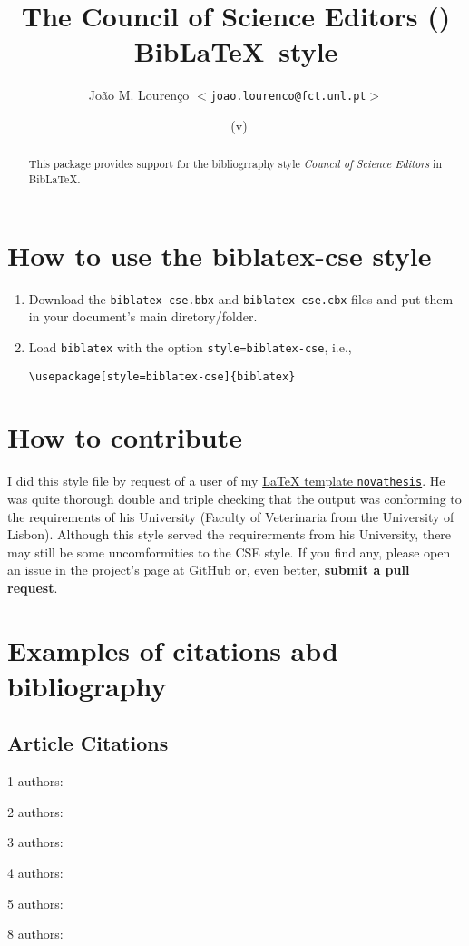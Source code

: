 \documentclass[
  a4paper, %
  11pt, %
]{article}
\title{The Council of Science Editors (\textsf{\filename}) Bib\LaTeX\ style}
\author{João M. Lourenço $<$\texttt{joao.lourenco@fct.unl.pt}$>$}
\date{\filedate\ (v\fileversion)}
\newcommand{\novathesis}{\texttt{novathesis}}
\newcommand{\nauthors}[1]{#1 authors: }
\begin{document}
  
  \maketitle

\begin{abstract}
    This package provides support for the bibliogrraphy style \emph{Council of Science Editors} in BibLaTeX.
\end{abstract}

\section{How to use the biblatex-cse style}

\begin{enumerate}
  \item Download the \texttt{biblatex-cse.bbx} and \texttt{biblatex-cse.cbx} files and put them in your document's main diretory/folder.
  \item Load \texttt{biblatex} with the option \texttt{style=biblatex-cse}, i.e.,
\begin{verbatim}
\usepackage[style=biblatex-cse]{biblatex}  
\end{verbatim}
\end{enumerate}

\section{How to contribute}

I did this style file by request of a user of my \href{https://github.com/joaomlourenco/novathesis}{LaTeX template \novathesis}.  He was quite thorough double and triple checking that the output was conforming to the requirements of his University (Faculty of Veterinaria from the University of Lisbon).  Although this \texttt{\filename} style served the requirerments from his University, there may still be some uncomformities to the CSE style.  If you find any, please open an issue \href{https://github.com/joaomlourenco/biblatex-cse}{in the project's page at GitHub} or, even better, \textbf{submit a pull request}.


\section{Examples of citations abd bibliography}
  
\subsection{Article Citations}
\indent
\par\nauthors{1}\cite{Duddington1955}
\par\nauthors{2}\cite{Asa2011}
\par\nauthors{3}\cite{Migaki1982}
\par\nauthors{4}\cite{Lysek1982}
\par\nauthors{5}\cite{Carvalho2007}
\par\nauthors{8}\cite{Riadigos2014}
\end{document}
